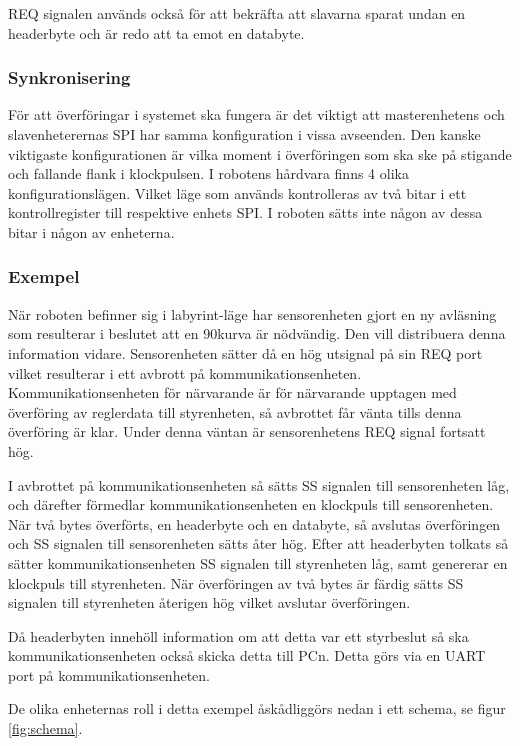 REQ signalen används också för att bekräfta att slavarna sparat undan en headerbyte och är redo att ta emot en databyte.

\subsubsection{Synkronisering}
För att överföringar i systemet ska fungera är det viktigt att masterenhetens och slavenheterernas SPI har samma konfiguration i vissa avseenden. Den kanske viktigaste konfigurationen är vilka moment i överföringen som ska ske på stigande och fallande flank i klockpulsen. I robotens hårdvara finns 4 olika konfigurationslägen. Vilket läge som används kontrolleras av två bitar i ett kontrollregister till respektive enhets SPI. I roboten sätts inte någon av dessa bitar i någon av enheterna.

\subsubsection{Exempel}

När roboten befinner sig i labyrint-läge har sensorenheten gjort en ny avläsning som resulterar i beslutet att en 90\degree kurva är nödvändig. Den vill distribuera denna information vidare. Sensorenheten sätter då en hög utsignal på sin REQ port vilket resulterar i ett avbrott på kommunikationsenheten. Kommunikationsenheten för närvarande är för närvarande upptagen med överföring av reglerdata till styrenheten, så avbrottet får vänta tills denna överföring är klar. Under denna väntan är sensorenhetens REQ signal fortsatt hög.

I avbrottet på kommunikationsenheten så sätts SS signalen till sensorenheten låg, och därefter förmedlar kommunikationsenheten en klockpuls till sensorenheten. När två bytes överförts, en headerbyte och en databyte, så avslutas överföringen och SS signalen till sensorenheten sätts åter hög. Efter att headerbyten tolkats så sätter kommunikationsenheten SS signalen till styrenheten låg, samt genererar en klockpuls till styrenheten. När överföringen av två bytes är färdig sätts SS signalen till styrenheten återigen hög vilket avslutar överföringen. 

Då headerbyten innehöll information om att detta var ett styrbeslut så ska kommunikationsenheten också skicka detta till PCn. Detta görs via en UART port på kommunikationsenheten.

De olika enheternas roll i detta exempel åskådliggörs nedan i ett schema, se figur \ref{fig:schema}.


